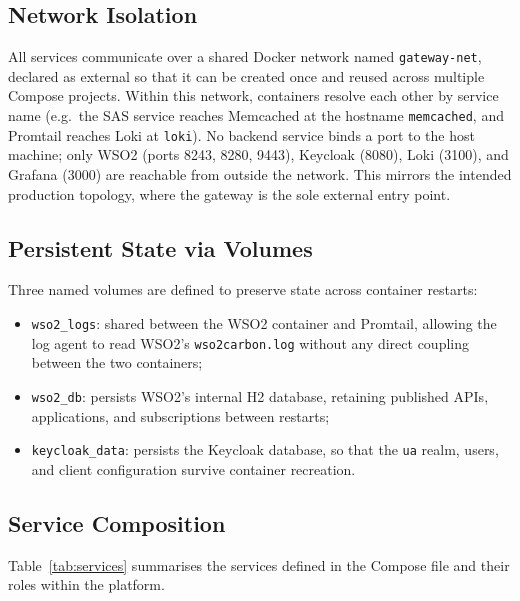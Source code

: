 \documentclass[12pt, a4paper]{report}
\begin{document}
\subsection{Network Isolation}
All services communicate over a shared Docker network named \texttt{gateway-net},
declared as external so that it can be created once and reused across multiple Compose
projects. Within this network, containers resolve each other by service name (e.g.\
the SAS service reaches Memcached at the hostname \texttt{memcached}, and Promtail
reaches Loki at \texttt{loki}). No backend service binds a port to the host machine;
only WSO2 (ports 8243, 8280, 9443), Keycloak (8080), Loki (3100), and Grafana (3000)
are reachable from outside the network. This mirrors the intended production topology,
where the gateway is the sole external entry point.

\subsection{Persistent State via Volumes}
Three named volumes are defined to preserve state across container restarts:
\begin{itemize}
    \item \texttt{wso2\_logs}: shared between the WSO2 container and Promtail,
          allowing the log agent to read WSO2's \texttt{wso2carbon.log} without any
          direct coupling between the two containers;
    \item \texttt{wso2\_db}: persists WSO2's internal H2 database, retaining
          published APIs, applications, and subscriptions between restarts;
    \item \texttt{keycloak\_data}: persists the Keycloak database, so that the
          \texttt{ua} realm, users, and client configuration survive container recreation.
\end{itemize}

\subsection{Service Composition}
Table~\ref{tab:services} summarises the services defined in the Compose file and their
roles within the platform.
\end{document}
